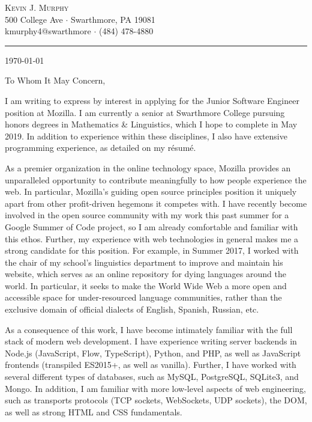 \documentclass[paper=a4, fontsize=12pt]{scrartcl} %
\begin{document}
\begin{flushright}
  { \Large
    \textsc{Kevin J. Murphy}\\
    \vspace{0.3em}
  }
  {
    \footnotesize
    500 College Ave $\cdot$ Swarthmore, PA 19081\\
    kmurphy4@swarthmore $\cdot$ (484) 478-4880\\
  }
\end{flushright}
\vspace{-2em}
\rule{\linewidth}{0.3pt}

\today

To Whom It May Concern,

I am writing to express by interest in applying for the Junior Software Engineer position at Mozilla.  I am currently a senior at Swarthmore College pursuing honors degrees in Mathematics \& Linguistics, which I hope to complete in May 2019.  In addition to experience within these disciplines, I also have extensive programming experience, as detailed on my r\'esum\'e.

As a premier organization in the online technology space, Mozilla provides an unparalleled opportunity to contribute meaningfully to how people experience the web.  In particular, Mozilla's guiding open source principles position it uniquely apart from other profit-driven hegemons it competes with.  I have recently become involved in the open source community with my work this past summer for a Google Summer of Code project, so I am already comfortable and familiar with this ethos.  Further, my experience with web technologies in general makes me a strong candidate for this position.  For example, in Summer 2017, I worked with the chair of my school's linguistics department to improve and maintain his website, which serves as an online repository for dying languages around the world.  In particular, it seeks to make the World Wide Web a more open and accessible space for under-resourced language communities, rather than the exclusive domain of official dialects of English, Spanish, Russian, etc.

As a consequence of this work, I have become intimately familiar with the full stack of modern web development.  I have experience writing server backends in Node.js (JavaScript, Flow, TypeScript), Python, and PHP, as well as JavaScript frontends (transpiled ES2015+, as well as vanilla).  Further, I have worked with several different types of databases, such as MySQL, PostgreSQL, SQLite3, and Mongo.  In addition, I am familiar with more low-level aspects of web engineering, such as transports protocols (TCP sockets, WebSockets, UDP sockets), the DOM, as well as strong HTML and CSS fundamentals.
\end{document}
